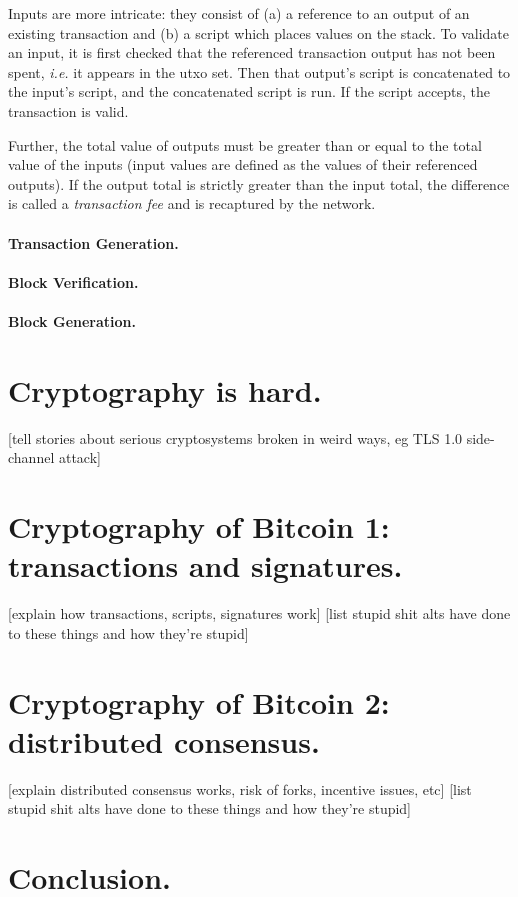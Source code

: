 \documentclass[letterpaper]{article}
\begin{document}
Inputs are more intricate: they consist of (a) a reference to an output
of an existing transaction and (b) a script which places values on the
stack. To validate an input, it is first checked that the referenced
transaction output has not been spent, \emph{i.e.} it appears in the
utxo set. Then that output's script is concatenated to the input's
script, and the concatenated script is run. If the script accepts,
the transaction is valid.

Further, the total value of outputs must be greater than or equal to
the total value of the inputs (input values are defined as the values
of their referenced outputs). If the output total is strictly greater
than the input total, the difference is called a \emph{transaction fee}
and is recaptured by the network.

\paragraph{Transaction Generation.} 

\paragraph{Block Verification.}

\paragraph{Block Generation.}

\section{Cryptography is hard.}

[tell stories about serious cryptosystems broken in weird ways, eg TLS 1.0 side-channel attack]

\section{Cryptography of Bitcoin 1: transactions and signatures.}

[explain how transactions, scripts, signatures work]
[list stupid shit alts have done to these things and how they're stupid]

\section{Cryptography of Bitcoin 2: distributed consensus.}

[explain distributed consensus works, risk of forks, incentive issues, etc]
[list stupid shit alts have done to these things and how they're stupid]

\section{Conclusion.}
\end{document}
